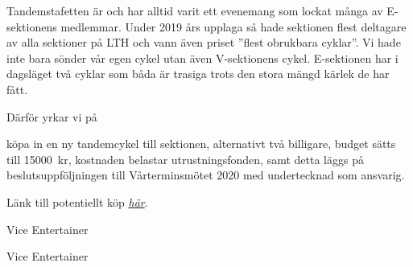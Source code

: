 \documentclass[../_main/handlingar.tex]{subfiles}
\begin{document}

Tandemstafetten är och har alltid varit ett evenemang som lockat många av E-sektionens
medlemmar. Under 2019 års upplaga så hade sektionen flest deltagare av alla sektioner på
LTH och vann även priset ”flest obrukbara cyklar”. Vi hade inte bara sönder vår egen cykel
utan även V-sektionens cykel. E-sektionen har i dagsläget två cyklar som båda är trasiga trots
den stora mängd kärlek de har fått.


Därför yrkar vi på
\begin{attsatser}
    \att köpa in en ny tandemcykel till sektionen, alternativt två billigare,
    \att budget sätts till \SI{15000}{kr},
    \att kostnaden belastar utrustningsfonden, samt
    \att detta läggs på beslutsuppföljningen till Vårterminsmötet 2020 med undertecknad som ansvarig.
\end{attsatser}

Länk till potentiellt köp \href{https://www.sportfritid.se/monark-tandem-3-vxl.html}{\textit{här}}.

\begin{signatures}{2}
    \mvh
    \signature{Simon Mahdavi}{Vice Entertainer}
    \signature{Casper Schwerin}{Vice Entertainer}
\end{signatures}
\end{document}
